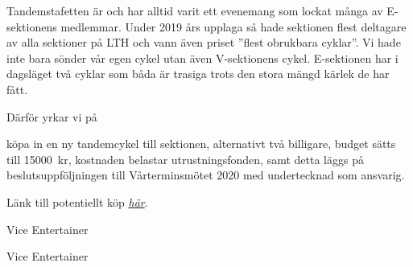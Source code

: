 \documentclass[../_main/handlingar.tex]{subfiles}
\begin{document}

Tandemstafetten är och har alltid varit ett evenemang som lockat många av E-sektionens
medlemmar. Under 2019 års upplaga så hade sektionen flest deltagare av alla sektioner på
LTH och vann även priset ”flest obrukbara cyklar”. Vi hade inte bara sönder vår egen cykel
utan även V-sektionens cykel. E-sektionen har i dagsläget två cyklar som båda är trasiga trots
den stora mängd kärlek de har fått.


Därför yrkar vi på
\begin{attsatser}
    \att köpa in en ny tandemcykel till sektionen, alternativt två billigare,
    \att budget sätts till \SI{15000}{kr},
    \att kostnaden belastar utrustningsfonden, samt
    \att detta läggs på beslutsuppföljningen till Vårterminsmötet 2020 med undertecknad som ansvarig.
\end{attsatser}

Länk till potentiellt köp \href{https://www.sportfritid.se/monark-tandem-3-vxl.html}{\textit{här}}.

\begin{signatures}{2}
    \mvh
    \signature{Simon Mahdavi}{Vice Entertainer}
    \signature{Casper Schwerin}{Vice Entertainer}
\end{signatures}
\end{document}
